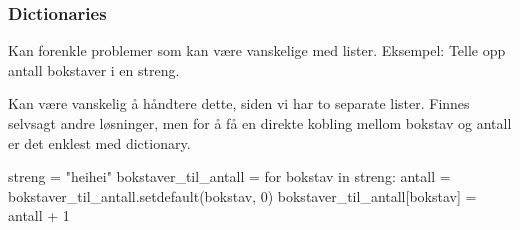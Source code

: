 \begin{frame}[fragile]
    \frametitle{Dictionaries}

    Kan forenkle problemer som kan være vanskelige med lister. Eksempel: Telle opp antall bokstaver i en streng. 

    Kan være vanskelig å håndtere dette, siden vi har to separate lister. Finnes selvsagt andre løsninger, men for å få en direkte kobling mellom bokstav og antall er det enklest med dictionary. 

\begin{python}
streng = "heihei"
bokstaver_til_antall = {}
for bokstav in streng: 
    antall = bokstaver_til_antall.setdefault(bokstav, 0)
    bokstaver_til_antall[bokstav] = antall + 1
\end{python}

\end{frame}
